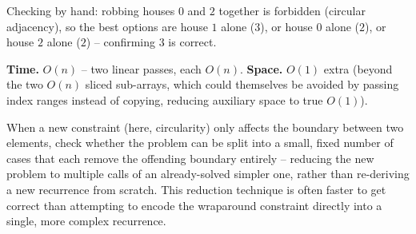 Checking by hand: robbing houses $0$ and $2$ together is forbidden
(circular adjacency), so the best options are house $1$ alone ($3$), or
house $0$ alone ($2$), or house $2$ alone ($2$) -- confirming $3$ is
correct.

\begin{complexitybox}
\textbf{Time.} $O(n)$ -- two linear passes, each $O(n)$.
\textbf{Space.} $O(1)$ extra (beyond the two $O(n)$ sliced sub-arrays,
which could themselves be avoided by passing index ranges instead of
copying, reducing auxiliary space to true $O(1)$).
\end{complexitybox}

\begin{takeawaybox}
When a new constraint (here, circularity) only affects the boundary
between two elements, check whether the problem can be split into a
small, fixed number of cases that each remove the offending boundary
entirely -- reducing the new problem to multiple calls of an
already-solved simpler one, rather than re-deriving a new recurrence
from scratch. This reduction technique is often faster to get correct
than attempting to encode the wraparound constraint directly into a
single, more complex recurrence.
\end{takeawaybox}
